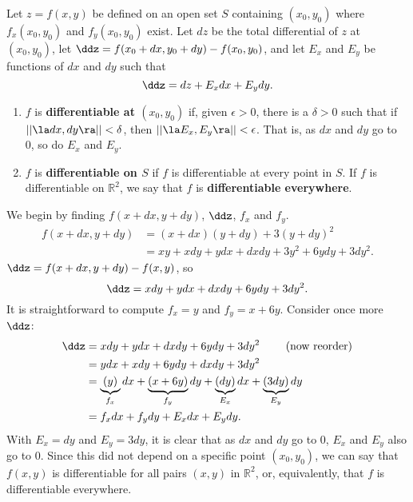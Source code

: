 {Let $z=f(x,y)$ be defined on an open set $S$ containing $(x_0,y_0)$ where $f_x(x_0,y_0)$ and $f_y(x_0,y_0)$ exist. Let $dz$ be the total differential of $z$ at $(x_0,y_0)$, let $\ddz = f(x_0+dx,y_0+dy) - f(x_0,y_0)$, and let $E_x$ and $E_y$ be functions of $dx$ and $dy$  such that 
$$\ddz = dz + E_xdx + E_ydy.$$
\begin{enumerate}
	\item $f$ is \textbf{differentiable at $(x_0,y_0)$} if, given $\epsilon >0$, there is a $\delta >0$ such that if $||\la dx,dy\ra|| < \delta$, then $||\la E_x,E_y\ra|| < \epsilon$. That is, as $dx$ and $dy$ go to 0, so do $E_x$ and $E_y$.
	\item	$f$ is \textbf{differentiable on $S$} if $f$ is differentiable at every point in $S$. If $f$ is differentiable on $\mathbb{R}^2$, we say that $f$ is \textbf{differentiable everywhere}.
\end{enumerate}
}

{We begin by finding $f(x+dx,y+dy)$, $\ddz$, $f_x$ and $f_y$.
\begin{align*}
f(x+dx,y+dy) &= (x+dx)(y+dy) + 3(y+dy)^2 \\
						&= xy + xdy+ydx+dxdy + 3y^2+6ydy+3dy^2.
\end{align*}
$\ddz = f(x+dx,y+dy) - f(x,y)$, so
$$\ddz = xdy + ydx + dxdy + 6ydy+3dy^2.$$
It is straightforward to compute $f_x = y$ and $f_y = x+6y$. Consider once more $\ddz$:
\begin{align*}
\ddz &= xdy + ydx + dxdy + 6ydy+3dy^2 \qquad \text{ (now reorder)}\\
		&= ydx + xdy+6ydy+ dxdy + 3dy^2\\
		&= \underbrace{(y)}_{f_x}dx + \underbrace{(x+6y)}_{f_y}dy + \underbrace{(dy)}_{E_x}dx+\underbrace{(3dy)}_{E_y}dy\\
		&= f_xdx + f_ydy + E_xdx+E_ydy.
\end{align*}
With $E_x = dy$ and $E_y = 3dy$, it is clear that as $dx$ and $ dy$ go to 0, $E_x$ and $E_y$ also go to 0. Since this did not depend on a specific point $(x_0,y_0)$, we can say that $f(x,y)$ is differentiable for all pairs $(x,y)$ in $\mathbb{R}^2$, or, equivalently, that $f$ is differentiable everywhere. }

